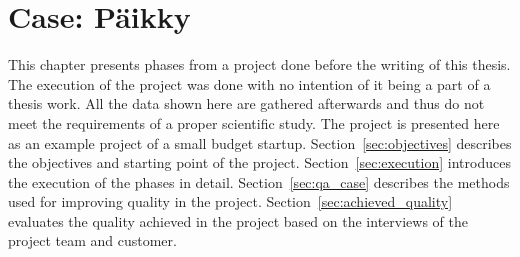 
 \chapter{Case: Päikky}

This chapter presents phases from a project done before the writing of this thesis. The execution of the project was done with no intention of it being a part of a thesis work. All the data shown here are gathered afterwards and thus do not meet the requirements of a proper scientific study. The project is presented here as an example project of a small budget startup. Section~\ref{sec:objectives} describes the objectives and starting point of the project. Section~\ref{sec:execution} introduces the execution of the phases in detail. Section~\ref{sec:qa_case} describes the methods used for improving quality in the project. Section~\ref{sec:achieved_quality} evaluates the quality achieved in the project based on the interviews of the project team and customer.




